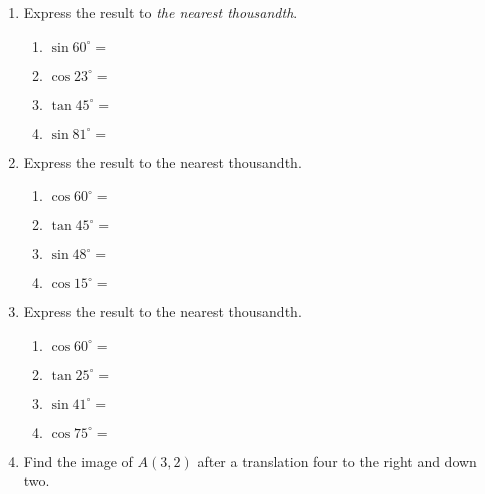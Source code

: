 \begin{enumerate}
\item Express the result to \emph{the nearest thousandth}.  \vspace{0.5cm}
  \begin{multicols}{2}
    \begin{enumerate}
      \item $\sin 60^\circ = $ \vspace{0.5cm}
      \item $\cos 23^\circ =$
      \item $\tan 45^\circ = $ \vspace{0.5cm}
      \item $\sin 81^\circ =$
    \end{enumerate}
  \end{multicols}

\item Express the result to the nearest thousandth.  %
\begin{multicols}{2}
  \begin{enumerate}
    \item $\cos 60^\circ = $ \vspace{0.5cm}
    \item $\tan 45^\circ =$
    \item $\sin 48^\circ = $ \vspace{0.5cm}
    \item $\cos 15^\circ =$
  \end{enumerate}
\end{multicols}

\item Express the result to the nearest thousandth.  \vspace{1cm}
  \begin{multicols}{2}
    \begin{enumerate}
      \item $\cos 60^\circ = $ \vspace{1cm}
      \item $\tan 25^\circ =$
      \item $\sin 41^\circ = $ \vspace{1cm}
      \item $\cos 75^\circ =$
    \end{enumerate}
  \end{multicols} \vspace{1cm}

\item Find the image of $A(3,2)$ after a translation four to the right and down two. \vspace{1cm}


\end{enumerate}
